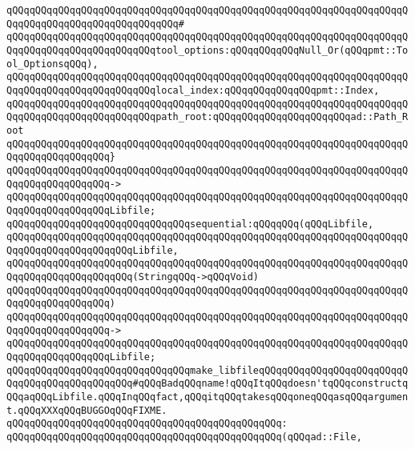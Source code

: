 \verb|qQQqqQQqqQQqqQQqqQQqqQQqqQQqqQQqqQQqqQQqqQQqqQQqqQQqqQQqqQQqqQQqqQQqqQQqqQQqqQQqqQQqqQQqqQQqqQQqqQQq#|\newline
\verb|qQQqqQQqqQQqqQQqqQQqqQQqqQQqqQQqqQQqqQQqqQQqqQQqqQQqqQQqqQQqqQQqqQQqqQQqqQQqqQQqqQQqqQQqqQQqqQQqtool_options:qQQqqQQqqQQqNull_Or(qQQqpmt::Tool_OptionsqQQq),|\newline
\verb|qQQqqQQqqQQqqQQqqQQqqQQqqQQqqQQqqQQqqQQqqQQqqQQqqQQqqQQqqQQqqQQqqQQqqQQqqQQqqQQqqQQqqQQqqQQqqQQqlocal_index:qQQqqQQqqQQqqQQqpmt::Index,|\newline
\verb|qQQqqQQqqQQqqQQqqQQqqQQqqQQqqQQqqQQqqQQqqQQqqQQqqQQqqQQqqQQqqQQqqQQqqQQqqQQqqQQqqQQqqQQqqQQqqQQqpath_root:qQQqqQQqqQQqqQQqqQQqqQQqad::Path_Root|\newline
\verb|qQQqqQQqqQQqqQQqqQQqqQQqqQQqqQQqqQQqqQQqqQQqqQQqqQQqqQQqqQQqqQQqqQQqqQQqqQQqqQQqqQQqqQQq}|\newline
\verb|qQQqqQQqqQQqqQQqqQQqqQQqqQQqqQQqqQQqqQQqqQQqqQQqqQQqqQQqqQQqqQQqqQQqqQQqqQQqqQQqqQQqqQQq->|\newline
\verb|qQQqqQQqqQQqqQQqqQQqqQQqqQQqqQQqqQQqqQQqqQQqqQQqqQQqqQQqqQQqqQQqqQQqqQQqqQQqqQQqqQQqqQQqLibfile;|\newline
\newline
\verb|qQQqqQQqqQQqqQQqqQQqqQQqqQQqqQQqsequential:qQQqqQQq(qQQqLibfile,|\newline
\verb|qQQqqQQqqQQqqQQqqQQqqQQqqQQqqQQqqQQqqQQqqQQqqQQqqQQqqQQqqQQqqQQqqQQqqQQqqQQqqQQqqQQqqQQqqQQqLibfile,|\newline
\verb|qQQqqQQqqQQqqQQqqQQqqQQqqQQqqQQqqQQqqQQqqQQqqQQqqQQqqQQqqQQqqQQqqQQqqQQqqQQqqQQqqQQqqQQqqQQq(StringqQQq->qQQqVoid)|\newline
\verb|qQQqqQQqqQQqqQQqqQQqqQQqqQQqqQQqqQQqqQQqqQQqqQQqqQQqqQQqqQQqqQQqqQQqqQQqqQQqqQQqqQQqqQQq)|\newline
\verb|qQQqqQQqqQQqqQQqqQQqqQQqqQQqqQQqqQQqqQQqqQQqqQQqqQQqqQQqqQQqqQQqqQQqqQQqqQQqqQQqqQQqqQQq->|\newline
\verb|qQQqqQQqqQQqqQQqqQQqqQQqqQQqqQQqqQQqqQQqqQQqqQQqqQQqqQQqqQQqqQQqqQQqqQQqqQQqqQQqqQQqqQQqLibfile;|\newline
\newline
\verb|qQQqqQQqqQQqqQQqqQQqqQQqqQQqqQQqmake_libfileqQQqqQQqqQQqqQQqqQQqqQQqqQQqqQQqqQQqqQQqqQQqqQQq#qQQqBadqQQqname!qQQqItqQQqdoesn'tqQQqconstructqQQqaqQQqLibfile.qQQqInqQQqfact,qQQqitqQQqtakesqQQqoneqQQqasqQQqargument.qQQqXXXqQQqBUGGOqQQqFIXME.|\newline
\verb|qQQqqQQqqQQqqQQqqQQqqQQqqQQqqQQqqQQqqQQqqQQqqQQq:|\newline
\verb|qQQqqQQqqQQqqQQqqQQqqQQqqQQqqQQqqQQqqQQqqQQqqQQq(qQQqad::File,|\newline
